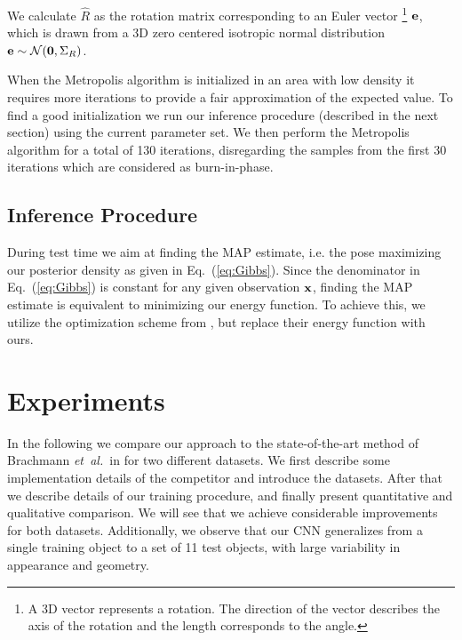 \documentclass[10pt,letterpaper]{article}
\newcommand{\bx}{{\bf x}}
\newcommand{\etal}{\mbox{\emph{et al.\ }}}
\begin{document}
We calculate $\hat{R}$ as the rotation matrix corresponding to an Euler vector \footnote{A 3D vector  represents a rotation. The direction of the vector describes the axis of the rotation and the length corresponds to the angle.} ${\bf e}$, which is drawn from a 3D zero centered isotropic normal distribution ${\bf e} \sim \mathcal{N}({\bf 0},{ \Sigma}_R)$.

When the Metropolis algorithm is initialized in an area with low density it requires more iterations to provide a fair approximation of the expected value. To find a good initialization we run our inference procedure (described in the next section) using the current parameter set. We then perform the Metropolis algorithm for a total of 130 iterations, disregarding the samples from the first 30 iterations which are considered as burn-in-phase.  


\subsection{Inference Procedure \label{sec:inference}}
During test time we aim at finding the MAP estimate, i.e. the pose maximizing our posterior density as given in Eq.~(\ref{eq:Gibbs}). Since the denominator in Eq.~(\ref{eq:Gibbs}) is constant for any given observation $\bx$, finding the MAP estimate is equivalent to minimizing our energy function. To achieve this, we utilize the optimization scheme from \cite{brachmann2014}, but replace their energy function with ours. 



\section{Experiments}
\label{sec:exp}

In the following we compare our approach to the state-of-the-art method of Brachmann \etal in \cite{brachmann2014} for two different datasets. We first describe some implementation details of the competitor and introduce the datasets. After that we describe details of our training procedure, and finally present quantitative and qualitative  comparison. We will see that we achieve considerable improvements for both datasets. Additionally, we observe that our CNN generalizes from a single training object to a set of 11 test objects, with large variability in appearance and geometry.  
\end{document}
